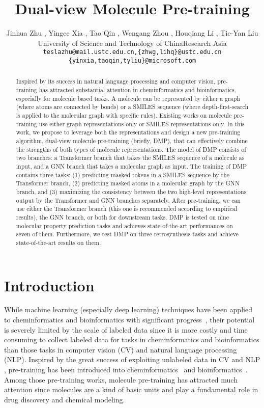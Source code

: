 \documentclass{article}
\title{Dual-view Molecule Pre-training}
\author{Jinhua Zhu , Yingce Xia , Tao Qin , Wengang Zhou , Houqiang Li , Tie{-}Yan Liu \\
   University of Science and Technology of China\quadMicrosoft Research Asia\\
  \texttt{teslazhu@mail.ustc.edu.cn,\;\{zhwg,lihq\}@ustc.edu.cn} \\
  \texttt{\{yinxia,taoqin,tyliu\}@microsoft.com}
}
\newcommand{\ourM}{DMP}
\begin{document}
\maketitle

\begin{abstract}
Inspired by its success in natural language processing and computer vision, pre-training has attracted substantial attention in cheminformatics and bioinformatics, especially for molecule based tasks. A molecule can be represented by either a graph (where atoms are connected by bonds) or a SMILES sequence (where depth-first-search is applied to the molecular graph with specific rules). Existing works on molecule pre-training use either graph representations only or SMILES representations only. In this work, we propose to leverage both the representations and design a new pre-training algorithm, dual-view molecule pre-training (briefly, \ourM{}), that can effectively combine the strengths of both types of molecule representations. The model of \ourM{} consists of two branches: a Transformer branch that takes the SMILES sequence of a molecule as input, and a GNN branch that takes a molecular graph as input. The training of \ourM{} contains three tasks: (1) predicting masked tokens in a SMILES sequence by the Transformer branch, (2) predicting masked atoms in a molecular graph by the GNN branch, and (3) maximizing the consistency between the two high-level representations output by the Transformer and GNN branches separately. After pre-training, we can use either the Transformer branch (this one is recommended according to empirical results), the GNN branch, or both for downstream tasks. \ourM{} is tested on nine molecular property prediction tasks and achieves state-of-the-art performances on seven of them. Furthermore, we test \ourM{} on three retrosynthesis tasks and achieve state-of-the-art results on them. 
\end{abstract}

\section{Introduction}
While machine learning (especially deep learning) techniques have been applied to cheminformatics and bioinformatics with significant progress~\cite{huang2016communication,david2020molecular}, their potential is severely limited by the scale of labeled data since it is more costly and time consuming to collect labeled data for tasks in cheminformatics and bioinformatics than those tasks in computer vision (CV) and natural language processing (NLP). Inspired by the great success of exploiting unlabeled data in CV and NLP  \cite{he2020momentum,grill2020bootstrap}, pre-training has been introduced into cheminformatics~\cite{hu2019strategies,chithrananda2020chemberta,wang2021molclr} and bioinformatics~\cite{rao2019evaluating,ESMpaper}. Among those  pre-training works, molecule pre-training has attracted much attention since molecules are a kind of basic units and play a fundamental  role in drug discovery and chemical modeling.
\end{document}
